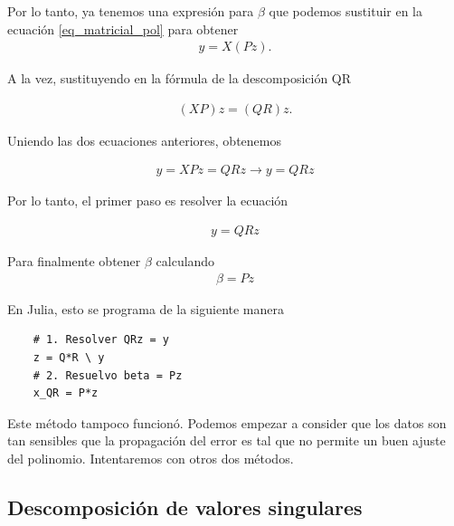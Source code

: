 Por lo tanto, ya tenemos una expresión para $\beta$ que podemos sustituir en la ecuación \ref{eq_matricial_pol} para obtener 
\begin{equation*}
    \begin{aligned}
    y = X (Pz) . 
    \end{aligned}
\end{equation*}

A la vez, sustituyendo en la fórmula de la descomposición QR

\begin{equation*}
    \begin{aligned}
    (XP) z = (QR) z . 
    \end{aligned}
\end{equation*}

Uniendo las dos ecuaciones anteriores, obtenemos 

\begin{equation*}
    \begin{aligned}
    y = XP z = QR z 
    \longrightarrow y = QRz
    \end{aligned}
\end{equation*}

Por lo tanto, el primer paso es resolver la ecuación 

\begin{equation*}
    \begin{aligned}
    y = QRz
    \end{aligned}
\end{equation*}

Para finalmente obtener $\beta$ calculando 
\begin{equation*}
    \begin{aligned}
    \beta = Pz
    \end{aligned}
\end{equation*}

En Julia, esto se programa de la siguiente manera
\begin{verbatim}
    # 1. Resolver QRz = y
    z = Q*R \ y
    # 2. Resuelvo beta = Pz
    x_QR = P*z
\end{verbatim}


Este método tampoco funcionó. Podemos empezar a consider que los datos son tan sensibles que la propagación del error es tal que no permite un buen ajuste del polinomio. Intentaremos con otros dos métodos.

\subsection{Descomposición de valores singulares}

